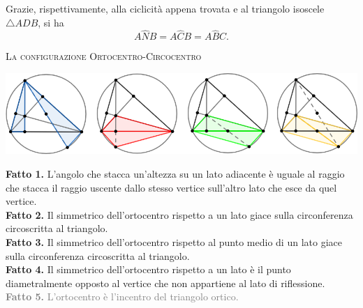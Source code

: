 \documentclass[a4paper]{article}
\theoremstyle{remark}
\theoremstyle{definition}
\begin{document}
\begin{multicols}{2}
Grazie, rispettivamente, alla ciclicità appena trovata e al triangolo isoscele $ \bigtriangleup ADB $, si ha
\[ A\hat{N}B = A\hat{C}B = A\hat{B}C.  \]

\columnbreak
\begin{center}
	\textsc{La configurazione Ortocentro-Circocentro}
\end{center}

\begin{center}
	\includegraphics[scale=0.25]{ehiu}
\end{center}

\textbf{Fatto 1.} L'angolo che stacca un'altezza su un lato adiacente è uguale al raggio che stacca il raggio uscente dallo stesso vertice sull'altro lato che esce da quel vertice. \\

\textbf{Fatto 2.} Il simmetrico dell'ortocentro rispetto a un lato giace sulla circonferenza circoscritta al triangolo. \\

\textbf{Fatto 3.} Il simmetrico dell'ortocentro rispetto al punto medio di un lato giace sulla circonferenza circoscritta al triangolo. \\

\textbf{Fatto 4.} Il simmetrico dell'ortocentro rispetto a un lato è il punto diametralmente opposto al vertice che non appartiene al lato di riflessione. \\

\textcolor{gray}{\textbf{Fatto 5.} L'ortocentro è l'incentro del triangolo ortico.} \\


\end{multicols}
\end{document}
